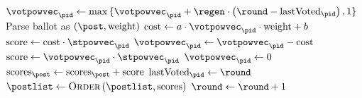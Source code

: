 \begin{algorithm}[H]
  \caption{$\textsc{HandleVote}\left(\mathrm{ballot},
  \player_{\pid}\right)$}
  \label{alg:steem:handlevote}
  \begin{algorithmic}[1]
     
      \State $\votpowvec_{\pid} \gets \max{\lbrace \votpowvec_{\pid} + \regen
      \cdot \left(\round - \mathrm{lastVoted}_{\pid}\right), 1 \rbrace}$
      \label{alg:steem:handlevote:regen}
        \State Parse ballot as $\left(\post, \mathrm{weight}\right)$
        \State $\mathrm{cost} \gets a \cdot \votpowvec_{\pid} \cdot
        \mathrm{weight} + b$
          \State $\mathrm{score} \gets \mathrm{cost} \cdot \stpowvec_{\pid}$
          \State $\votpowvec_{\pid} \gets \votpowvec_{\pid} - \mathrm{cost}$
        \Else
          \State $\mathrm{score} \gets \votpowvec_{\pid} \cdot
          \stpowvec_{\pid}$
          \State $\votpowvec_{\pid} \gets 0$
        \EndIf
        \State $\mathrm{scores}_\post \gets \mathrm{scores}_\post +
        \mathrm{score}$
      \EndIf
      \State $\mathrm{lastVoted}_{\pid} \gets \round$
    \EndIf
      \State $\postlist \gets \textsc{Order}\left(\postlist,
      \mathrm{scores}\right)$ 
      \State $\round \gets \round + 1$
    \EndIf {}
  \end{algorithmic}
\end{algorithm}
